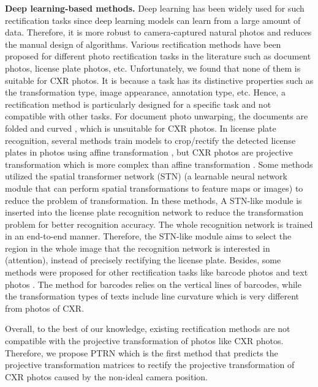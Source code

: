\documentclass[preprint, 12pt]{elsarticle}
\begin{document}
\textbf{Deep learning-based methods.}
Deep learning has been widely used for such rectification tasks since deep learning models can learn from a large amount of data. Therefore, it is more robust to camera-captured natural photos and reduces the manual design of algorithms. Various rectification methods have been proposed for different photo rectification tasks in the literature such as document photos, license plate photos, etc. Unfortunately, we found that none of them is suitable for CXR photos. It is because a task has its distinctive properties such as the transformation type, image appearance, annotation type, etc. Hence, a rectification method is particularly designed for a specific task and not compatible with other tasks. For document photo unwarping, the documents are folded and curved \cite{xue2022fourier,jiang2022revisiting,bandyopadhyay2022rectinet,ma2018docunet,das2019dewarpnet,feng2021docscanner,quan2022recovering}, which is unsuitable for CXR photos. In license plate recognition, several methods train models to crop/rectify the detected license plates in photos using affine transformation \cite{silva2021flexible,bjorklund2019robust,silva2018license}, but CXR photos are projective transformation which is more complex than affine transformation \cite{solomon2011fundamentals}. Some methods \cite{xu20212d, xu2021eilpr} utilized the spatial transformer network (STN) \cite{jaderberg2015spatial} (a learnable neural network module that can perform spatial transformations to feature maps or images) to reduce the problem of transformation. In these methods, A STN-like module is inserted into the license plate recognition network to reduce the transformation problem for better recognition accuracy. The whole recognition network is trained in an end-to-end manner. Therefore, the STN-like module aims to select the region in the whole image that the recognition network is interested in (attention), instead of precisely rectifying the license plate. Besides, some methods were proposed for other rectification tasks like barcode photos \cite{xiao20191d} and text photos \cite{zhan2019esir, xue2022detection}. The method for barcodes relies on the vertical lines of barcodes, while the transformation types of texts include line curvature which is very different from photos of CXR.

Overall, to the best of our knowledge, existing rectification methods are not compatible with the projective transformation of photos like CXR photos. Therefore, we propose PTRN which is the first method that predicts the projective transformation matrices to rectify the projective transformation of CXR photos caused by the non-ideal camera position.
\end{document}
